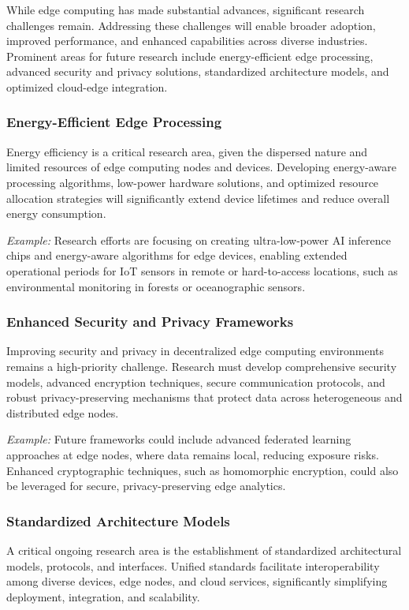 \documentclass[runningheads]{llncs}
\begin{document}
While edge computing has made substantial advances, significant research challenges remain. Addressing these challenges will enable broader adoption, improved performance, and enhanced capabilities across diverse industries. Prominent areas for future research include energy-efficient edge processing, advanced security and privacy solutions, standardized architecture models, and optimized cloud-edge integration.


\subsubsection{Energy-Efficient Edge Processing}
Energy efficiency is a critical research area, given the dispersed nature and limited resources of edge computing nodes and devices. Developing energy-aware processing algorithms, low-power hardware solutions, and optimized resource allocation strategies will significantly extend device lifetimes and reduce overall energy consumption.

\noindent\textit{Example:} Research efforts are focusing on creating ultra-low-power AI inference chips and energy-aware algorithms for edge devices, enabling extended operational periods for IoT sensors in remote or hard-to-access locations, such as environmental monitoring in forests or oceanographic sensors.

\subsubsection{Enhanced Security and Privacy Frameworks}
Improving security and privacy in decentralized edge computing environments remains a high-priority challenge. Research must develop comprehensive security models, advanced encryption techniques, secure communication protocols, and robust privacy-preserving mechanisms that protect data across heterogeneous and distributed edge nodes.

\noindent\textit{Example:} Future frameworks could include advanced federated learning approaches at edge nodes, where data remains local, reducing exposure risks. Enhanced cryptographic techniques, such as homomorphic encryption, could also be leveraged for secure, privacy-preserving edge analytics.

\subsubsection{Standardized Architecture Models}
A critical ongoing research area is the establishment of standardized architectural models, protocols, and interfaces. Unified standards facilitate interoperability among diverse devices, edge nodes, and cloud services, significantly simplifying deployment, integration, and scalability.
\end{document}
